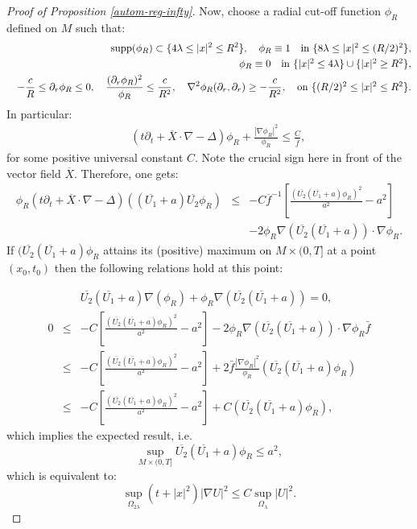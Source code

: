 \documentclass[a4paper,11pt,reqno]{amsart}
\def\supp{\mathop{\rm supp}\nolimits}
\begin{document}
\begin{proof}[Proof of Proposition \ref{autom-reg-infty}]
Now, choose a radial cut-off function $\phi_R$ defined on $M$ such that:
\begin{eqnarray*}
&& \supp(\phi_R)\subset \{4\lambda\leq|x|^2\leq R^2\},\quad\phi_R\equiv 1\quad\mbox{in $\{8\lambda\leq|x|^2\leq (R/2)^2\}$},\\
&& \phi_R\equiv 0\quad\mbox{in $\{|x|^2\leq 4\lambda\}\cup\{|x|^2\geq R^2\}$},\\
 &&-\frac{c}{R}\leq \partial_r\phi_R\leq 0,\quad\frac{(\partial_r\phi_R)^2}{\phi_R}\leq \frac{c}{R^2},\quad \nabla^2\phi_R(\partial_r,\partial_r)\geq -\frac{c}{R^2},\quad \mbox{on $\{(R/2)^2\leq|x|^2\leq R^2\}$}.
 \end{eqnarray*}
 In particular:
 \begin{eqnarray*}
&&\left(t\partial_t+\overline{X}\cdot\nabla-\Delta \right)\phi_R+\frac{|\nabla\phi_R|^2}{\phi_R}\leq \frac{C}{\bar{f}},
\end{eqnarray*}
for some positive universal constant $C$. Note the crucial sign here in front of the vector field $\overline{X}$. Therefore, one gets:
\begin{eqnarray*}
\phi_R\left(t\partial_t+\overline{X}\cdot\nabla-\Delta \right)((\overline{U_1}+a)\overline{U_2}\phi_R)&\leq& -C\overline{f}^{-1}\left[\frac{(\overline{U_2}(\overline{U_1}+a)\phi_R)^2}{a^2}-a^2\right]\\
&&-2\phi_R\nabla(\overline{U_2}(\overline{U_1}+a))\cdot\nabla\phi_R.
\end{eqnarray*}
If $(\overline{U_2}(\overline{U_1}+a)\phi_R$ attains its (positive) maximum on $M\times(0,T]$ at a point $(x_0,t_0)$ then the following relations hold at this point:

\begin{eqnarray*}
&&\overline{U_2}(\overline{U_1}+a)\nabla(\phi_R)+\phi_R\nabla(\overline{U_2}(\overline{U_1}+a))=0,\\
0&\leq& -C\left[\frac{(\overline{U_2}(\overline{U_1}+a)\phi_R)^2}{a^2}-a^2\right]-2\phi_R\nabla(\overline{U_2}(\overline{U_1}+a))\cdot\nabla\phi_R\bar{f}\\
&\leq& -C\left[\frac{(\overline{U_2}(\overline{U_1}+a)\phi_R)^2}{a^2}-a^2\right]+2\bar{f}\frac{|\nabla\phi_R|^2}{\phi_R}(\overline{U_2}(\overline{U_1}+a)\phi_R)\\
&\leq&-C\left[\frac{(\overline{U_2}(\overline{U_1}+a)\phi_R)^2}{a^2}-a^2\right]+C(\overline{U_2}(\overline{U_1}+a)\phi_R),
\end{eqnarray*}
which implies the expected result, i.e. 
$$\sup_{M\times(0,T]}\overline{U_2}(\overline{U_1}+a)\phi_R\leq a^2,$$ which is equivalent to: $$\sup_{\Omega_{2\lambda}}(t+|x|^2)|\nabla U|^2\leq C\sup_{\Omega_{\lambda}}|U|^2.$$


\end{proof}
\end{document}
